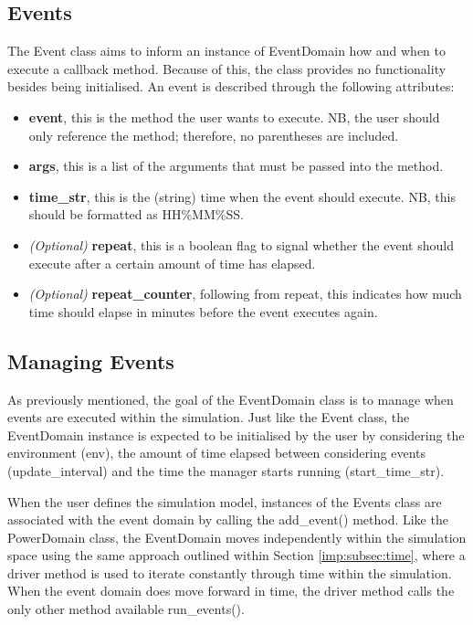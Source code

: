 \documentclass{l4proj}
\begin{document}
\subsection{Events}\label{imp:subsec:event-class}
The Event class aims to inform an instance of EventDomain how and when to execute a callback method.
Because of this, the class provides no functionality besides being initialised.
An event is described through the following attributes:
\begin{itemize}
    \item \textbf{event}, this is the method the user wants to execute. NB, the user should only reference the method; therefore, no parentheses are included.
    \item \textbf{args}, this is a list of the arguments that must be passed into the method.
    \item \textbf{time\_str}, this is the (string) time when the event should execute. NB, this should be formatted as HH\%MM\%SS.
    \item \textit{(Optional)} \textbf{repeat}, this is a boolean flag to signal whether the event should execute after a certain amount of time has elapsed.
    \item \textit{(Optional)} \textbf{repeat\_counter}, following from repeat, this indicates how much time should elapse in minutes before the event executes again.
\end{itemize}

\subsection{Managing Events}\label{imp:subsec:event-domain-class}
As previously mentioned, the goal of the EventDomain class is to manage when events are executed within the simulation.
Just like the Event class, the EventDomain instance is expected to be initialised by the user by considering the environment (env), the amount of time elapsed between considering events (update\_interval) and the time the manager starts running (start\_time\_str).

When the user defines the simulation model, instances of the Events class are associated with the event domain by calling the add\_event() method.
Like the PowerDomain class, the EventDomain moves independently within the simulation space using the same approach outlined within Section \ref{imp:subsec:time}, where a driver method is used to iterate constantly through time within the simulation.
When the event domain does move forward in time, the driver method calls the only other method available run\_events().
\end{document}
